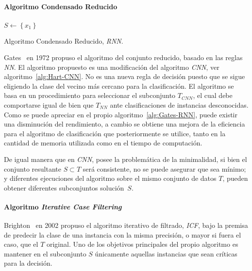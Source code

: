 \paragraph{Algoritmo Condensado Reducido}\label{paragraph:RNN}
\hfill \break
\begin{algorithm}[H]
  	\BlankLine
  $S \leftarrow \left\lbrace x_1 \right\rbrace$\\
	\caption{Algoritmo Condensado Reducido, \textit{RNN}.}\label{alg:Gates-RNN}
\end{algorithm}
Gates~\cite{gates1972reduced} en 1972 propuso el algoritmo del conjunto reducido, basado en las reglas \textit{NN}. El algoritmo propuesto es una modificación del algoritmo \textit{CNN}, ver algoritmo~\ref{alg:Hart-CNN}. No es una nueva regla de decisión puesto que se sigue eligiendo la clase del vecino más cercano para la clasificación. 
El algoritmo se basa en un procedimiento para seleccionar el subconjunto $T_{CNN}$, el cual debe comportarse igual de bien que $T_{NN}$ ante clasificaciones de instancias desconocidas. Como se puede apreciar en el propio algoritmo~\ref{alg:Gates-RNN}, puede existir una disminución del rendimiento, a cambio se obtiene una mejora de la eficiencia para el algoritmo de clasificación que posteriormente se utilice, tanto en la cantidad de memoria utilizada como en el tiempo de computación.

De igual manera que en \textit{CNN}, posee la problemática de la minimalidad, si bien el conjunto resultante $S \subset T$ será consistente, no se puede asegurar que sea mínimo; y diferentes ejecuciones del algoritmo sobre el mismo conjunto de datos $T$, pueden obtener diferentes subconjuntos solución~$S$.

\paragraph{Algoritmo \textit{Iterative Case Filtering}}\label{subsubsub:ICF}
\hfill \break
Brighton~\cite{brighton2002advances} en 2002 propuso el algoritmo iterativo de filtrado, \textit{ICF}, bajo la premisa de predecir la clase de una instancia con la misma precisión, o mayor si fuera el caso, que el $T$ original. Uno de los objetivos principales del propio algoritmo es mantener en el subconjunto $S$ únicamente aquellas instancias que sean críticas para la decisión.


